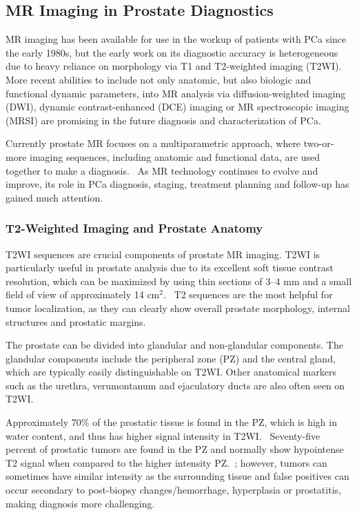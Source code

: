 ﻿\subsection{MR Imaging in Prostate Diagnostics}
MR imaging has been available for use in the workup of patients with PCa since
the early 1980s, but the early work on its diagnostic accuracy is heterogeneous
due to heavy reliance on morphology via T1 and T2-weighted imaging (T2WI). More
recent abilities to include not only anatomic, but also biologic and functional
dynamic parameters, into MR analysis via diffusion-weighted imaging (DWI),
dynamic contrast-enhanced (DCE) imaging or MR spectroscopic imaging (MRSI) are
promising in the future diagnosis and characterization of PCa.

Currently prostate MR focuses on a multiparametric approach, where two-or-more
imaging sequences, including anatomic and functional data, are used together to
make a diagnosis.~\cite{Barentsz2012} As MR technology continues to evolve and
improve, its role in PCa diagnosis, staging, treatment planning and follow-up
has gained much attention.

\subsubsection{T2-Weighted Imaging and Prostate Anatomy}
T2WI sequences are crucial components of prostate MR imaging.  T2WI is
particularly useful in prostate analysis due to its excellent soft tissue
contrast resolution, which can be maximized by using thin sections of 3--4 mm
and a small field of view of approximately 14
cm$^2$.~\cite{Gupta2013,Bonekamp2011} T2 sequences are the most helpful for
tumor localization, as they can clearly show overall prostate morphology,
internal structures and prostatic margins.~\cite{Gupta2013}

The prostate can be divided into glandular and non-glandular components. The
glandular components include the peripheral zone (PZ) and the central gland,
which are typically easily distinguishable on T2WI.  Other anatomical markers
such as the urethra, verumontanum and ejaculatory ducts are also often seen on
T2WI. 

Approximately 70\% of the prostatic tissue is found in the PZ, which is high in
water content, and thus has higher signal intensity in T2WI.~\cite{Jung2012}
Seventy-five percent of prostatic tumors are found in the PZ and normally show
hypointense T2 signal when compared to the higher intensity
PZ.~\cite{Hricak2007,Hegde2013}; however, tumors can sometimes have similar
intensity as the surrounding tissue and false positives can occur secondary to
post-biopsy changes/hemorrhage, hyperplasia or prostatitis, making diagnosis
more challenging.~\cite{Hegde2013}

